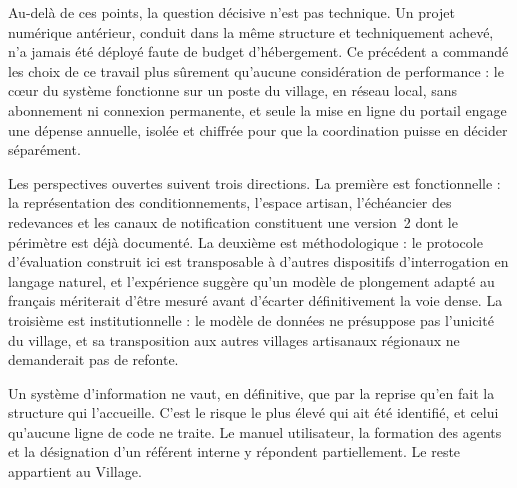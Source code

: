 Au-delà de ces points, la question décisive n'est pas technique. Un projet numérique antérieur, conduit dans la même structure et techniquement achevé, n'a jamais été déployé faute de budget d'hébergement. Ce précédent a commandé les choix de ce travail plus sûrement qu'aucune considération de performance : le cœur du système fonctionne sur un poste du village, en réseau local, sans abonnement ni connexion permanente, et seule la mise en ligne du portail engage une dépense annuelle, isolée et chiffrée pour que la coordination puisse en décider séparément.

Les perspectives ouvertes suivent trois directions. La première est fonctionnelle : la représentation des conditionnements, l'espace artisan, l'échéancier des redevances et les canaux de notification constituent une version~2 dont le périmètre est déjà documenté. La deuxième est méthodologique : le protocole d'évaluation construit ici est transposable à d'autres dispositifs d'interrogation en langage naturel, et l'expérience suggère qu'un modèle de plongement adapté au français mériterait d'être mesuré avant d'écarter définitivement la voie dense. La troisième est institutionnelle : le modèle de données ne présuppose pas l'unicité du village, et sa transposition aux autres villages artisanaux régionaux ne demanderait pas de refonte.

Un système d'information ne vaut, en définitive, que par la reprise qu'en fait la structure qui l'accueille. C'est le risque le plus élevé qui ait été identifié, et celui qu'aucune ligne de code ne traite. Le manuel utilisateur, la formation des agents et la désignation d'un référent interne y répondent partiellement. Le reste appartient au Village.
